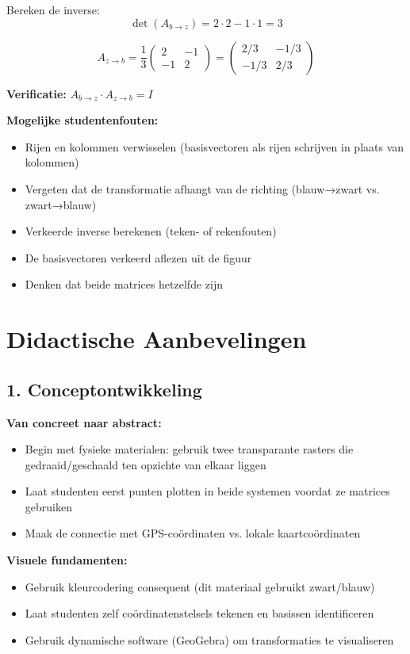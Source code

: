 \documentclass{ximera}
\begin{document}
\begin{freeResponse}
Bereken de inverse:
$$\det(A_{b \to z}) = 2 \cdot 2 - 1 \cdot 1 = 3$$

$$A_{z \to b} = \frac{1}{3} \begin{pmatrix} 2 & -1 \\ -1 & 2 \end{pmatrix} = \begin{pmatrix} 2/3 & -1/3 \\ -1/3 & 2/3 \end{pmatrix}$$

\textbf{Verificatie:} $A_{b \to z} \cdot A_{z \to b} = I$

\textbf{Mogelijke studentenfouten:}
\begin{itemize}
\item Rijen en kolommen verwisselen (basisvectoren als rijen schrijven in plaats van kolommen)
\item Vergeten dat de transformatie afhangt van de richting (blauw→zwart vs. zwart→blauw)
\item Verkeerde inverse berekenen (teken- of rekenfouten)
\item De basisvectoren verkeerd aflezen uit de figuur
\item Denken dat beide matrices hetzelfde zijn
\end{itemize}
\end{freeResponse}

\section*{Didactische Aanbevelingen}

\subsection*{1. Conceptontwikkeling}

\textbf{Van concreet naar abstract:}
\begin{itemize}
\item Begin met fysieke materialen: gebruik twee transparante rasters die gedraaid/geschaald ten opzichte van elkaar liggen
\item Laat studenten eerst punten plotten in beide systemen voordat ze matrices gebruiken
\item Maak de connectie met GPS-coördinaten vs. lokale kaartcoördinaten
\end{itemize}

\textbf{Visuele fundamenten:}
\begin{itemize}
\item Gebruik kleurcodering consequent (dit materiaal gebruikt zwart/blauw)
\item Laat studenten zelf coördinatenstelsels tekenen en basissen identificeren
\item Gebruik dynamische software (GeoGebra) om transformaties te visualiseren
\end{itemize}
\end{document}

